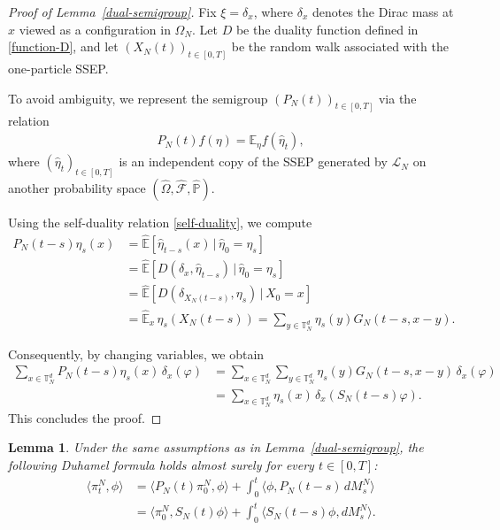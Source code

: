 \documentclass[UTF-8,reqno]{amsart}
\numberwithin{equation}{section}
\newtheorem{lemma}[theorem]{Lemma}
\begin{document}
\begin{proof}[Proof of Lemma~\ref{dual-semigroup}]
Fix $\xi = \delta_x$, where $\delta_x$ denotes the Dirac mass at $x$ viewed as a configuration in $\Omega_N$. Let $D$ be the duality function defined in \eqref{function-D}, and let $(X_N(t))_{t \in [0,T]}$ be the random walk associated with the one-particle SSEP.

To avoid ambiguity, we represent the semigroup $(P_N(t))_{t \in [0,T]}$ via the relation
\begin{align*}
P_N(t)f(\eta) = \mathbb{E}_{\eta} f(\hat{\eta}_t),
\end{align*}
where $(\hat{\eta}_t)_{t \in [0,T]}$ is an independent copy of the SSEP generated by $\mathcal{L}_N$ on another probability space $(\hat{\Omega}, \hat{\mathcal{F}}, \hat{\mathbb{P}})$.

Using the self-duality relation \eqref{self-duality}, we compute
\begin{align*}
P_N(t-s)\eta_s(x)
&= \hat{\mathbb{E}} \left[ \hat{\eta}_{t-s}(x) \,\big|\, \hat{\eta}_0 = \eta_s \right] \\
&= \hat{\mathbb{E}} \left[ D(\delta_x, \hat{\eta}_{t-s}) \,\big|\, \hat{\eta}_0 = \eta_s \right] \\
&= \hat{\mathbb{E}} \left[ D(\delta_{X_N(t-s)}, \eta_s) \,\big|\, X_0 = x \right] \\
&= \hat{\mathbb{E}}_x \, \eta_s(X_N(t-s)) 
= \sum_{y \in \mathbb{T}^d_N} \eta_s(y) G_N(t-s, x - y).
\end{align*}

Consequently, by changing variables, we obtain
\begin{align*}
\sum_{x \in \mathbb{T}^d_N} P_N(t-s)\eta_s(x) \, \delta_{x}(\varphi)
&= \sum_{x \in \mathbb{T}^d_N} \sum_{y \in \mathbb{T}^d_N} \eta_s(y) G_N(t-s, x - y) \, \delta_{x}(\varphi) \\
&= \sum_{x \in \mathbb{T}^d_N} \eta_s(x) \, \delta_{x}(S_N(t-s)\varphi).
\end{align*}
This concludes the proof.
\end{proof}


\begin{lemma}\label{Duhamel-formula}
Under the same assumptions as in Lemma~\ref{dual-semigroup}, the following Duhamel formula holds almost surely for every $t \in [0,T]$:
\begin{align*}
	\langle \pi^N_t, \phi \rangle 
	&= \langle P_N(t)\pi^N_0, \phi \rangle + \int_0^t \langle \phi, P_N(t-s) \, dM^N_s \rangle \\
	&= \langle \pi^N_0, S_N(t)\phi \rangle + \int_0^t \langle S_N(t-s)\phi, dM^N_s \rangle.
\end{align*}
\end{lemma}
\end{document}
